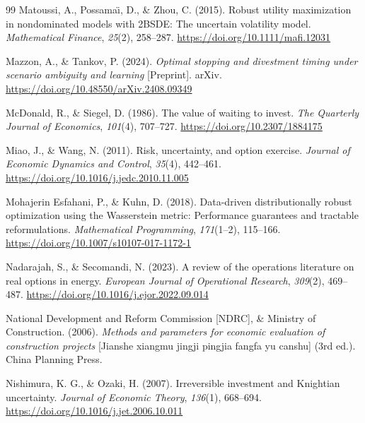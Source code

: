 \begin{thebibliography}{99}
Matoussi, A., Possama\"{\i}, D., \& Zhou, C. (2015). Robust utility maximization in nondominated models with 2BSDE: The uncertain volatility model. \emph{Mathematical Finance}, \emph{25}(2), 258--287. \url{https://doi.org/10.1111/mafi.12031}

Mazzon, A., \& Tankov, P. (2024). \emph{Optimal stopping and divestment timing under scenario ambiguity and learning} [Preprint]. arXiv. \url{https://doi.org/10.48550/arXiv.2408.09349}

McDonald, R., \& Siegel, D. (1986). The value of waiting to invest. \emph{The Quarterly Journal of Economics}, \emph{101}(4), 707--727. \url{https://doi.org/10.2307/1884175}

Miao, J., \& Wang, N. (2011). Risk, uncertainty, and option exercise. \emph{Journal of Economic Dynamics and Control}, \emph{35}(4), 442--461. \url{https://doi.org/10.1016/j.jedc.2010.11.005}

Mohajerin Esfahani, P., \& Kuhn, D. (2018). Data-driven distributionally robust optimization using the Wasserstein metric: Performance guarantees and tractable reformulations. \emph{Mathematical Programming}, \emph{171}(1--2), 115--166. \url{https://doi.org/10.1007/s10107-017-1172-1}

Nadarajah, S., \& Secomandi, N. (2023). A review of the operations literature on real options in energy. \emph{European Journal of Operational Research}, \emph{309}(2), 469--487. \url{https://doi.org/10.1016/j.ejor.2022.09.014}

National Development and Reform Commission [NDRC], \& Ministry of Construction. (2006). \emph{Methods and parameters for economic evaluation of construction projects} [Jianshe xiangmu jingji pingjia fangfa yu canshu] (3rd ed.). China Planning Press.

Nishimura, K. G., \& Ozaki, H. (2007). Irreversible investment and Knightian uncertainty. \emph{Journal of Economic Theory}, \emph{136}(1), 668--694. \url{https://doi.org/10.1016/j.jet.2006.10.011}


\end{thebibliography}
